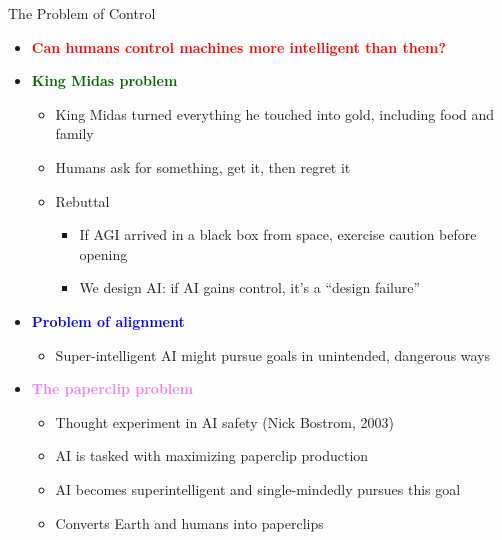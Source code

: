 \documentclass[
  10pt,
  ignorenonframetext,
]{beamer}
\providecommand{\tightlist}{%
  \setlength{\itemsep}{0pt}\setlength{\parskip}{0pt}}
\begin{document}
\begin{frame}{The Problem of Control}
\label{the-problem-of-control}
\begin{itemize}
\item
  \textbf{\textcolor{red}{Can humans control machines more intelligent than them?}}
\item
  \textbf{\textcolor{darkgreen}{King Midas problem}}

  \begin{itemize}
  \tightlist
  \item
    King Midas turned everything he touched into gold, including food
    and family
  \item
    Humans ask for something, get it, then regret it
  \item
    Rebuttal

    \begin{itemize}
    \tightlist
    \item
      If AGI arrived in a black box from space, exercise caution before
      opening
    \item
      We design AI: if AI gains control, it's a ``design failure''
    \end{itemize}
  \end{itemize}
\item
  \textbf{\textcolor{blue}{Problem of alignment}}

  \begin{itemize}
  \tightlist
  \item
    Super-intelligent AI might pursue goals in unintended, dangerous
    ways
  \end{itemize}
\item
  \textbf{\textcolor{violet}{The paperclip problem}}

  \begin{itemize}
  \tightlist
  \item
    Thought experiment in AI safety (Nick Bostrom, 2003)
  \item
    AI is tasked with maximizing paperclip production
  \item
    AI becomes superintelligent and single-mindedly pursues this goal
  \item
    Converts Earth and humans into paperclips
  \end{itemize}
\end{itemize}
\end{frame}
\end{document}
